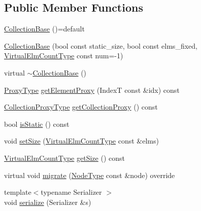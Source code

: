 \subsection*{Public Member Functions}
\begin{DoxyCompactItemize}
\item 
\hyperlink{structvt_1_1vrt_1_1collection_1_1_collection_base_ab2134eca144d6b2703fffb12c71d9f9b}{Collection\+Base} ()=default
\item 
\hyperlink{structvt_1_1vrt_1_1collection_1_1_collection_base_a265f5fb675e04d9ea6ec332743bc6d14}{Collection\+Base} (bool const static\+\_\+size, bool const elms\+\_\+fixed, \hyperlink{namespacevt_ac115668758184050beff7a9281a2c490}{Virtual\+Elm\+Count\+Type} const num=-\/1)
\item 
virtual \hyperlink{structvt_1_1vrt_1_1collection_1_1_collection_base_aa343e5527cb05addb8bbb04994ebc23e}{$\sim$\+Collection\+Base} ()
\item 
\hyperlink{structvt_1_1vrt_1_1collection_1_1_collection_base_a0c2fd2443732bebc963f6278b7ba089b}{Proxy\+Type} \hyperlink{structvt_1_1vrt_1_1collection_1_1_collection_base_acf2b3173e77b083920e3d4a06728e4c6}{get\+Element\+Proxy} (IndexT const \&idx) const
\item 
\hyperlink{structvt_1_1vrt_1_1collection_1_1_collection_base_af40b40a2ee128748bcb917f14a0152b4}{Collection\+Proxy\+Type} \hyperlink{structvt_1_1vrt_1_1collection_1_1_collection_base_ad97d9ab1a28fb535c5d7f82c15e99791}{get\+Collection\+Proxy} () const
\item 
bool \hyperlink{structvt_1_1vrt_1_1collection_1_1_collection_base_a526626889fb46b7206e1fc3a7a97a646}{is\+Static} () const
\item 
void \hyperlink{structvt_1_1vrt_1_1collection_1_1_collection_base_a17f8b36a4b4035d9d8ac977d844edb8c}{set\+Size} (\hyperlink{namespacevt_ac115668758184050beff7a9281a2c490}{Virtual\+Elm\+Count\+Type} const \&elms)
\item 
\hyperlink{namespacevt_ac115668758184050beff7a9281a2c490}{Virtual\+Elm\+Count\+Type} \hyperlink{structvt_1_1vrt_1_1collection_1_1_collection_base_a8a3b23d2d9512ec3d1a471028276e2d7}{get\+Size} () const
\item 
virtual void \hyperlink{structvt_1_1vrt_1_1collection_1_1_collection_base_a34f089d6f08e84b1745a265ad865807a}{migrate} (\hyperlink{namespacevt_a866da9d0efc19c0a1ce79e9e492f47e2}{Node\+Type} const \&node) override
\item 
{\footnotesize template$<$typename Serializer $>$ }\\void \hyperlink{structvt_1_1vrt_1_1collection_1_1_collection_base_a8f5dc077e523958ea8b7290b8a10846f}{serialize} (Serializer \&s)
\end{DoxyCompactItemize}
